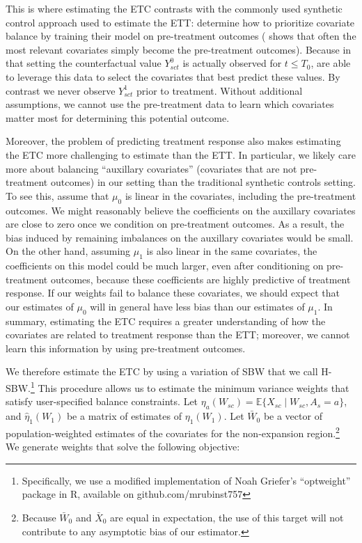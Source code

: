 \documentclass[aoas]{imsart}
\theoremstyle{plain}
\theoremstyle{remark}
\begin{document}
This is where estimating the ETC contrasts with the commonly used synthetic control approach used to estimate the ETT: \cite{abadie2010synthetic} determine how to prioritize covariate balance by training their model on pre-treatment outcomes (\cite{kaul2015synthetic} shows that often the most relevant covariates simply become the pre-treatment outcomes). Because in that setting the counterfactual value $Y^0_{sct}$ is actually observed for $t \le T_0$, \cite{abadie2010synthetic} are able to leverage this data to select the covariates that best predict these values. By contrast we never observe $Y^1_{sct}$ prior to treatment. Without additional assumptions, we cannot use the pre-treatment data to learn which covariates matter most for determining this potential outcome.

Moreover, the problem of predicting treatment response also makes estimating the ETC more challenging to estimate than the ETT. In particular, we likely care more about balancing ``auxillary covariates'' (covariates that are not pre-treatment outcomes) in our setting than the traditional synthetic controls setting. To see this, assume that $\mu_0$ is linear in the covariates, including the pre-treatment outcomes. We might reasonably believe the coefficients on the auxillary covariates are close to zero once we condition on pre-treatment outcomes. As a result, the bias induced by remaining imbalances on the auxillary covariates would be small. On the other hand, assuming $\mu_1$ is also linear in the same covariates, the coefficients on this model could be much larger, even after conditioning on pre-treatment outcomes, because these coefficients are highly predictive of treatment response. If our weights fail to balance these covariates, we should expect that our estimates of $\mu_0$ will in general have less bias than our estimates of $\mu_1$. In summary, estimating the ETC requires a greater understanding of how the covariates are related to treatment response than the ETT; moreover, we cannot learn this information by using pre-treatment outcomes.

We therefore estimate the ETC by using a variation of SBW that we call H-SBW.\footnote{Specifically, we use a modified implementation of Noah Griefer's ``optweight'' package in R, available on github.com/mrubinst757} This procedure allows us to estimate the minimum variance weights that satisfy user-specified balance constraints. Let $\eta_a(W_{sc}) = \mathbb{E}\{X_{sc} \mid W_{sc}, A_s = a\}$, and $\hat{\eta}_1(W_1)$ be a matrix of estimates of $\eta_1(W_1)$. Let $\bar{W}_0$ be a vector of population-weighted estimates of the covariates for the non-expansion region.\footnote{Because $\bar{W}_0$ and $\bar{X}_0$ are equal in expectation, the use of this target will not contribute to any asymptotic bias of our estimator.} We generate weights that solve the following objective:
\end{document}

